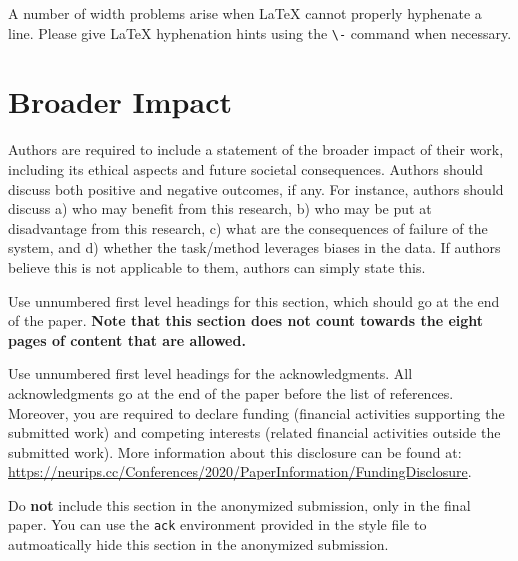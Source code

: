 \documentclass{article}
\begin{document}
A number of width problems arise when \LaTeX{} cannot properly hyphenate a
line. Please give LaTeX hyphenation hints using the \verb+\-+ command when
necessary.


\section*{Broader Impact}

Authors are required to include a statement of the broader impact of their work, including its ethical aspects and future societal consequences.
Authors should discuss both positive and negative outcomes, if any. For instance, authors should discuss a)
who may benefit from this research, b) who may be put at disadvantage from this research, c) what are the consequences of failure of the system, and d) whether the task/method leverages
biases in the data. If authors believe this is not applicable to them, authors can simply state this.

Use unnumbered first level headings for this section, which should go at the end of the paper. {\bf Note that this section does not count towards the eight pages of content that are allowed.}

\begin{ack}
    Use unnumbered first level headings for the acknowledgments. All acknowledgments
    go at the end of the paper before the list of references. Moreover, you are required to declare
    funding (financial activities supporting the submitted work) and competing interests (related financial activities outside the submitted work).
    More information about this disclosure can be found at: \url{https://neurips.cc/Conferences/2020/PaperInformation/FundingDisclosure}.


    Do {\bf not} include this section in the anonymized submission, only in the final paper. You can use the \texttt{ack} environment provided in the style file to autmoatically hide this section in the anonymized submission.
\end{ack}
\end{document}
